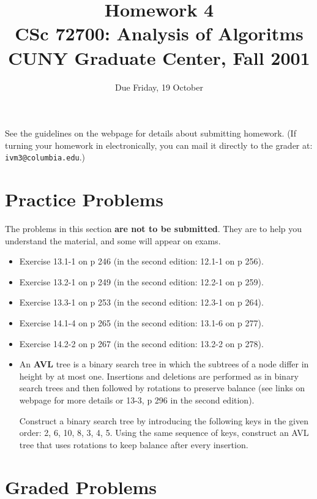 \documentclass[11pt]{article}
\begin{document}
\title{Homework 4\\
       CSc 72700: Analysis of Algoritms\\
       CUNY Graduate Center, Fall 2001 }
\date{Due Friday, 19 October}
\author{}
\maketitle

See the guidelines on the webpage for details about submitting homework.
(If turning your homework in electronically, you can mail it directly
to the grader at: {\tt ivm3@columbia.edu}.)

\section*{Practice Problems}

The problems in this section {\bf are not to be submitted}.  They are to
help you understand the material, and some will appear on exams.

\begin{itemize}
    \item Exercise 13.1-1 on p 246 (in the second edition: 12.1-1 on p 256).
    \item Exercise 13.2-1 on p 249 (in the second edition: 12.2-1 on p 259).
    \item Exercise 13.3-1 on p 253 (in the second edition: 12.3-1 on p 264).
    \item Exercise 14.1-4 on p 265 (in the second edition: 13.1-6 on p 277).
    \item Exercise 14.2-2 on p 267 (in the second edition: 13.2-2 on p 278).
    \item An {\bf AVL} tree is a binary search tree in which the subtrees of
	a node differ in height by at most one.  Insertions and deletions 
	are performed as in binary search trees and then followed by  
	rotations to preserve balance (see links on webpage for more details
	or 13-3, p 296 in the second edition).
	
	Construct a binary search tree by introducing the following keys 
	in the given order: 2, 6, 10, 8, 3, 4, 5.  Using the same sequence 
	of keys, construct an AVL tree that uses rotations to keep balance
	after every insertion.
\end{itemize}

\section*{Graded Problems}
\end{document}

